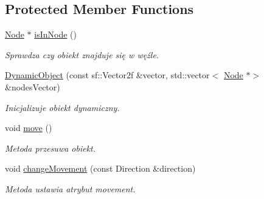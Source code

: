 \subsection*{Protected Member Functions}
\begin{DoxyCompactItemize}
\item 
\hyperlink{classNode}{Node} $\ast$ \hyperlink{classDynamicObject_af121dbd6d880bf772494ae251e272693}{is\+In\+Node} ()
\begin{DoxyCompactList}\small\item\em Sprawdza czy obiekt znajduje się w węźle. \end{DoxyCompactList}\item 
\hyperlink{classDynamicObject_a5e007abd09c1a213c913ec0dbf11be7a}{Dynamic\+Object} (const sf\+::\+Vector2f \&vector, std\+::vector$<$ \hyperlink{classNode}{Node} $\ast$$>$ \&nodes\+Vector)
\begin{DoxyCompactList}\small\item\em Inicjalizuje obiekt dynamiczny. \end{DoxyCompactList}\item 
void \hyperlink{classDynamicObject_a9fb1ce835d8c4ffe0a3ffd799067be9a}{move} ()
\begin{DoxyCompactList}\small\item\em Metoda przesuwa obiekt. \end{DoxyCompactList}\item 
\mbox{\label{classDynamicObject_aba876e4dabfefa89c00b9926108216dc}} 
void \hyperlink{classDynamicObject_aba876e4dabfefa89c00b9926108216dc}{change\+Movement} (const Direction \&direction)
\begin{DoxyCompactList}\small\item\em Metoda ustawia atrybut movement. \end{DoxyCompactList}\end{DoxyCompactItemize}

